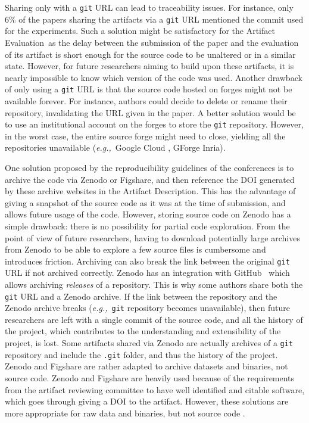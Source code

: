 \documentclass[sigconf,natbib=false]{acmart}
\newcommand{\eg}{\emph{e.g.,}}
\newcommand{\ad}{Artifact Description}
\newcommand{\aeval}{Artifact Evaluation}
\begin{document}
Sharing only with a \texttt{git} URL can lead to traceability issues.
For instance, only 6\% of the papers sharing the artifacts via a \texttt{git} URL mentioned the commit used for the experiments.
Such a solution might be satisfactory for the \aeval\ as the delay between the submission of the paper and the evaluation of its artifact is short enough for the source code to be unaltered or in a similar state.
However, for future researchers aiming to build upon these artifacts, it is nearly impossible to know which version of the code was used.
Another drawback of only using a \texttt{git} URL is that the source code hosted on forges might not be available forever.
For instance, authors could decide to delete or rename their repository, invalidating the URL given in the paper.
A better solution would be to use an institutional account on the forges to store the \texttt{git} repository.
However, in the worst case, the entire source forge might need to close, yielding all the repositories unavailable (\eg\ Google Cloud \cite{google_code}, GForge Inria).

One solution proposed by the reproducibility guidelines of the conferences is to archive the code via Zenodo or Figshare, and then reference the DOI generated by these archive websites in the \ad.
This has the advantage of giving a snapshot of the source code as it was at the time of submission, and allows future usage of the code.
However, storing source code on Zenodo has a simple drawback: there is no possibility for partial code exploration.
From the point of view of future researchers, having to download potentially large archives from Zenodo to be able to explore a few source files is cumbersome and introduces friction.
Archiving can also break the link between the original \texttt{git} URL if not archived correctly.
Zenodo has an integration with GitHub\ \cite{github_zenodo} which allows archiving \emph{releases} of a repository.
This is why some authors share both the \texttt{git} URL and a Zenodo archive.
If the link between the repository and the Zenodo archive breaks (\eg\ \texttt{git} repository becomes unavailable), then future researchers are left with a single commit of the source code, and all the history of the project, which contributes to the understanding and extensibility of the project, is lost.
Some artifacts shared via Zenodo are actually archives of a \texttt{git} repository and include the \texttt{.git} folder, and thus the history of the project.
Zenodo and Figshare are rather adapted to archive datasets and binaries, not source code.
Zenodo and Figshare are heavily used because of the requirements from the artifact reviewing committee to have well identified and citable software, which goes through giving a DOI to the artifact.
However, these solutions are more appropriate for raw data and binaries, but not source code \cite{alliez2019attributing, software_heritage_2017}.
\end{document}
